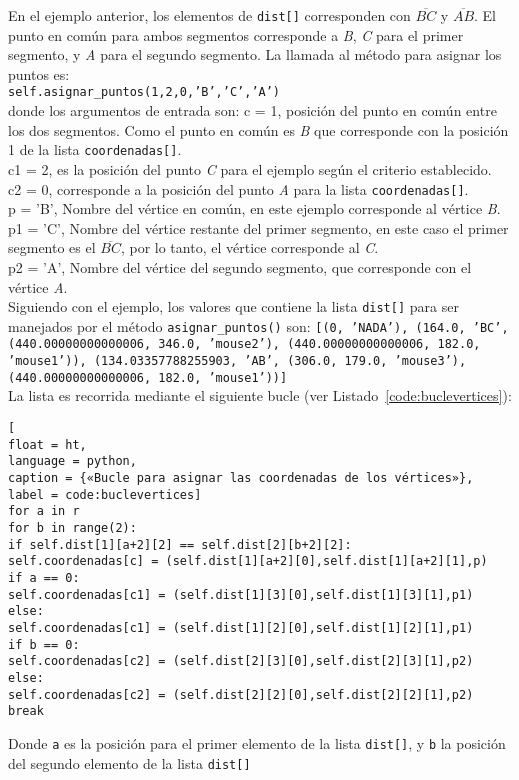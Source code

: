 En el ejemplo anterior, los elementos de \texttt{dist[]} corresponden con $\overline{BC}$ y $\overline{AB}$. El punto en común para ambos segmentos corresponde a \textit{\textit{B}}, \textit{C} para el primer segmento, y \textit{A} para el segundo segmento.
La llamada al método para asignar los puntos es:\\
\texttt{self.asignar\_puntos(1,2,0,'B','C','A')}\\
donde los argumentos de entrada son:
c = 1, posición del punto en común entre los dos segmentos. Como el punto en común es \textit{B} que corresponde con la posición 1 de la lista \texttt{coordenadas[]}.\\
c1 = 2, es la posición del punto \textit{C} para el ejemplo según el criterio establecido.\\
c2 = 0, corresponde a la posición del punto \textit{A} para la lista \texttt{coordenadas[]}.\\
p = 'B', Nombre del vértice en común, en este ejemplo corresponde al vértice \textit{B}.\\
p1 = 'C', Nombre del vértice restante del primer segmento, en este caso el primer segmento es el $\overline{BC}$, por lo tanto, el vértice corresponde al \textit{C}.\\
p2 = 'A', Nombre del vértice del segundo segmento, que corresponde con el vértice \textit{A}.\\

Siguiendo con el ejemplo, los valores que contiene la lista \texttt{dist[]} para ser manejados por el método \texttt{asignar\_puntos()} son:
\texttt{[(0, 'NADA'), (164.0, 'BC', (440.00000000000006, 346.0, 'mouse2'), (440.00000000000006, 182.0, 'mouse1')), (134.03357788255903, 'AB', (306.0, 179.0, 'mouse3'), (440.00000000000006, 182.0, 'mouse1'))]}\\

La lista es recorrida mediante el siguiente bucle (ver Listado~\ref{code:buclevertices}):
\begin{lstlisting}[
float = ht, 
language = python,
caption = {«Bucle para asignar las coordenadas de los vértices»},
label = code:buclevertices]
for a in r
for b in range(2):
if self.dist[1][a+2][2] == self.dist[2][b+2][2]:
self.coordenadas[c] = (self.dist[1][a+2][0],self.dist[1][a+2][1],p)
if a == 0:
self.coordenadas[c1] = (self.dist[1][3][0],self.dist[1][3][1],p1)
else:
self.coordenadas[c1] = (self.dist[1][2][0],self.dist[1][2][1],p1)
if b == 0:
self.coordenadas[c2] = (self.dist[2][3][0],self.dist[2][3][1],p2)
else:
self.coordenadas[c2] = (self.dist[2][2][0],self.dist[2][2][1],p2)
break
\end{lstlisting}
Donde \texttt{a} es la posición para el primer elemento de la lista \texttt{dist[]}, y \texttt{b} la posición del segundo elemento de la lista \texttt{dist[]}

